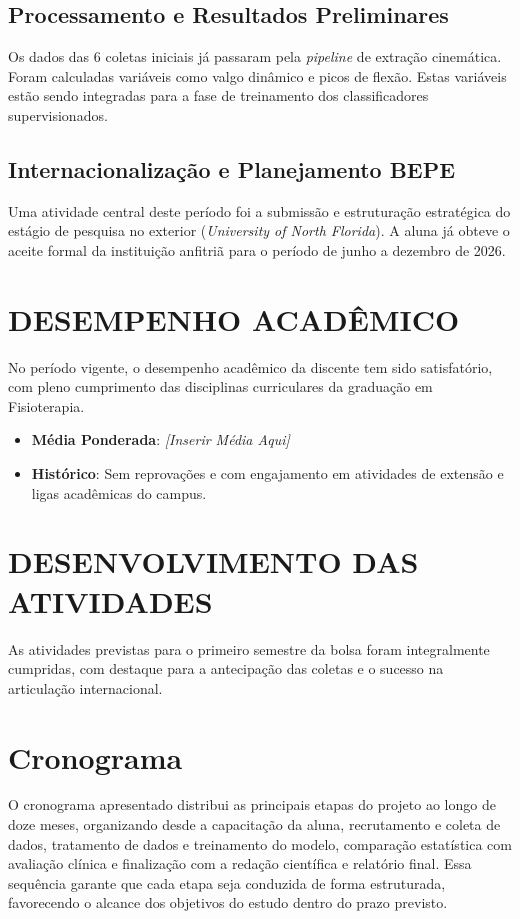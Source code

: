 \documentclass{article}
\begin{document}
\subsection{Processamento e Resultados Preliminares}
Os dados das 6 coletas iniciais já passaram pela \textit{pipeline} de extração cinemática. Foram calculadas variáveis como valgo dinâmico e picos de flexão. Estas variáveis estão sendo integradas para a fase de treinamento dos classificadores supervisionados.

\subsection{Internacionalização e Planejamento BEPE}
Uma atividade central deste período foi a submissão e estruturação estratégica do estágio de pesquisa no exterior (\textit{University of North Florida}). A aluna já obteve o aceite formal da instituição anfitriã para o período de junho a dezembro de 2026.

\section{DESEMPENHO ACADÊMICO}
No período vigente, o desempenho acadêmico da discente tem sido satisfatório, com pleno cumprimento das disciplinas curriculares da graduação em Fisioterapia. 
\begin{itemize}
    \item \textbf{Média Ponderada}: \textit{[Inserir Média Aqui]}
    \item \textbf{Histórico}: Sem reprovações e com engajamento em atividades de extensão e ligas acadêmicas do campus.
\end{itemize}

\section{DESENVOLVIMENTO DAS ATIVIDADES}
As atividades previstas para o primeiro semestre da bolsa foram integralmente cumpridas, com destaque para a antecipação das coletas e o sucesso na articulação internacional.

\section{Cronograma}

\noindent O cronograma apresentado distribui as principais etapas do projeto ao longo de doze meses, organizando desde a capacitação da aluna, recrutamento e coleta de dados, tratamento de dados e treinamento do modelo, comparação estatística com avaliação clínica e finalização com a redação científica e relatório final. Essa sequência garante que cada etapa seja conduzida de forma estruturada, favorecendo o alcance dos objetivos do estudo dentro do prazo previsto.
\end{document}
